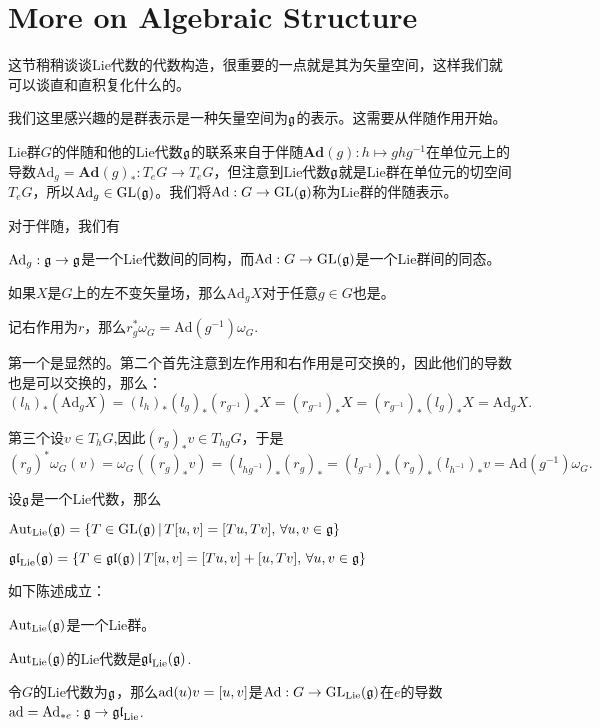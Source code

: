 \section{More on Algebraic Structure}

这节稍稍谈谈Lie代数的代数构造，很重要的一点就是其为矢量空间，这样我们就可以谈直和直积复化什么的。

我们这里感兴趣的是群表示是一种矢量空间为${\mathfrak{g}}$的表示。这需要从伴随作用开始。

Lie群$G$的伴随和他的Lie代数${\mathfrak{g}}$的联系来自于伴随$\mathbf{Ad}(g):h\mapsto ghg^{-1}$在单位元上的导数$\mathrm{Ad}_g=\mathbf{Ad}(g)_*:T_eG\to T_eG$，但注意到Lie代数${\mathfrak{g}}$就是Lie群在单位元的切空间$T_eG$，所以$\mathrm{Ad}_g\in \mathrm{GL}({\mathfrak{g}})$。我们将$\mathrm{Ad}:G\to \mathrm{GL}({\mathfrak{g}})$称为Lie群的伴随表示。

\para 对于伴随，我们有

 $\mathrm{Ad}_g:{\mathfrak{g}}\to {\mathfrak{g}}$是一个Lie代数间的同构，而$\mathrm{Ad}:G\to \mathrm{GL}({\mathfrak{g}})$是一个Lie群间的同态。

 如果$X$是$G$上的左不变矢量场，那么$\mathrm{Ad}_gX$对于任意$g\in G$也是。

 记右作用为$r$，那么$r_g^*\omega_G=\mathrm{Ad}(g^{-1})\omega_G$.


第一个是显然的。第二个首先注意到左作用和右作用是可交换的，因此他们的导数也是可以交换的，那么：
\[
	(l_h)_*(\mathrm{Ad}_gX)=(l_h)_*(l_g)_*(r_{g^{-1}})_*X=(r_{g^{-1}})_*X=(r_{g^{-1}})_*(l_g)_*X=\mathrm{Ad}_gX.
\]

第三个设$v\in T_hG$,因此$(r_g)_*v\in T_{hg}G$，于是
\[
	(r_g)^*\omega_G(v)=\omega_G((r_g)_*v)=(l_{{hg}^{-1}})_*(r_g)_*
	=(l_{{g}^{-1}})_*(r_g)_*(l_{{h}^{-1}})_*v=\mathrm{Ad}(g^{-1})\omega_G.
\]

\para 设${\mathfrak{g}}$是一个Lie代数，那么

 $\mathrm{Aut}_{\mathrm{Lie}}({\mathfrak{g}})=\{T\in \mathrm{GL}({\mathfrak{g}})\,|\,T[u,v]=[Tu,Tv],\,\forall u,v\in{\mathfrak{g}}\}$

 $\mathfrak{gl}_{\mathrm{Lie}}({\mathfrak{g}})=\{T\in \mathfrak{gl}({\mathfrak{g}})\,|\,T[u,v]=[Tu,v]+[u,Tv],\,\forall u,v\in{\mathfrak{g}}\}$

\para 如下陈述成立：

 $\mathrm{Aut}_{\mathrm{Lie}}({\mathfrak{g}})$是一个Lie群。

 $\mathrm{Aut}_{\mathrm{Lie}}({\mathfrak{g}})$的Lie代数是$\mathfrak{gl}_{\mathrm{Lie}}({\mathfrak{g}})$.

 令$G$的Lie代数为${\mathfrak{g}}$，那么$\operatorname{ad}(u)v=[u,v]$是$\mathrm{Ad}:G\to \mathrm{GL}_{\mathrm{Lie}}({\mathfrak{g}})$在$e$的导数$\operatorname{ad}=\mathrm{Ad}_{*e}:{\mathfrak{g}}\to \mathfrak{gl}_{\mathrm{Lie}}$.

